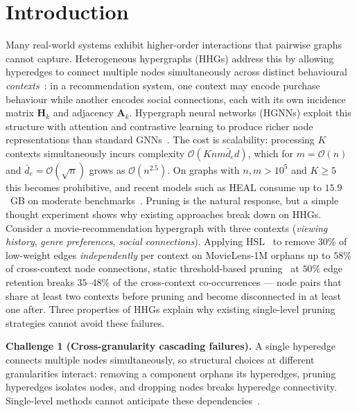 \documentclass[10pt]{article}
\theoremstyle{plain}
\theoremstyle{definition}
\begin{document}
\section{Introduction}
\label{sec:intro}

Many real-world systems exhibit higher-order interactions that pairwise graphs cannot capture. Heterogeneous hypergraphs (HHGs) address this by allowing hyperedges to connect multiple nodes simultaneously across distinct behavioural \emph{contexts}~\citep{kim2024survey,zhou2020graph}: in a recommendation system, one context may encode purchase behaviour while another encodes social connections, each with its own incidence matrix $\mathbf{H}_k$ and adjacency $\mathbf{A}_k$. Hypergraph neural networks (HGNNs) exploit this structure with attention and contrastive learning to produce richer node representations than standard GNNs~\citep{fountoulakis2023graph,antelmi2023survey,qian2024dual}. The cost is scalability: processing $K$ contexts simultaneously incurs complexity $\mathcal{O}(Knm\bar{d}_e d)$, which for $m\!=\!\mathcal{O}(n)$ and $\bar{d}_e\!=\!\mathcal{O}(\sqrt{n})$ grows as $\mathcal{O}(n^{2.5})$. On graphs with $n,m\!>\!10^{5}$ and $K\!\geq\!5$ this becomes prohibitive, and recent models such as HEAL consume up to $15.9$~GB on moderate benchmarks~\citep{ju2024hypergraph}. Pruning is the natural response, but a simple thought experiment shows why existing approaches break down on HHGs. Consider a movie-recommendation hypergraph with three contexts (\emph{viewing history}, \emph{genre preferences}, \emph{social connections}). Applying HSL~\citep{cai2022hypergraph} to remove $30\%$ of low-weight edges \emph{independently} per context on MovieLens-1M orphans up to $58\%$ of cross-context node connections, static threshold-based pruning~\citep{cai2022hypergraph,lin2024filter} at $50\%$ edge retention breaks $35$--$48\%$ of the cross-context co-occurrences --- node pairs that share at least two contexts before pruning and become disconnected in at least one after. Three properties of HHGs explain why existing single-level pruning strategies cannot avoid these failures.

\textbf{Challenge 1 (Cross-granularity cascading failures).}  A single hyperedge connects multiple nodes simultaneously, so structural choices at different granularities interact: removing a component orphans its hyperedges, pruning hyperedges isolates nodes, and dropping nodes breaks hyperedge connectivity. Single-level methods cannot anticipate these dependencies~\citep{cai2022hypergraph}.
\end{document}
